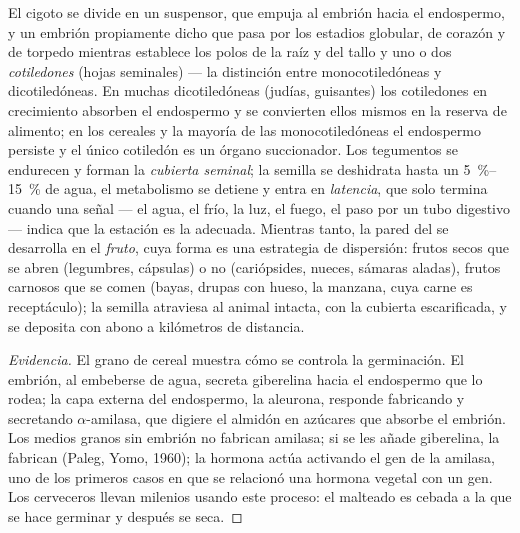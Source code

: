 \begin{definition}\label{def:b2:angiosperm-reproduction:seed}
El cigoto se divide en un suspensor, que empuja al embrión hacia el
endospermo, y un embrión propiamente dicho que pasa por los estadios
globular, de corazón y de torpedo mientras establece los polos de la
raíz y del tallo y uno o dos \emph{cotiledones} (hojas seminales) --- la
distinción entre monocotiledóneas y dicotiledóneas. En muchas
dicotiledóneas (judías, guisantes) los cotiledones en crecimiento
absorben el endospermo y se convierten ellos mismos en la reserva de
alimento; en los cereales y la mayoría de las monocotiledóneas el
endospermo persiste y el único cotiledón es un órgano succionador. Los
tegumentos se endurecen y forman la \emph{cubierta seminal}; la semilla
se deshidrata hasta un \qtyrange{5}{15}{\%} de agua, el metabolismo se
detiene y entra en \emph{latencia}, que solo termina cuando una señal
--- el agua, el frío, la luz, el fuego, el paso por un tubo digestivo ---
indica que la estación es la adecuada. Mientras tanto, la pared del
 se desarrolla en el \emph{fruto}, cuya forma es una estrategia de
dispersión: frutos secos que se abren (legumbres, cápsulas) o no
(cariópsides, nueces, sámaras aladas), frutos carnosos que se comen
(bayas, drupas con hueso, la manzana, cuya carne es receptáculo); la
semilla atraviesa al animal intacta, con la cubierta escarificada, y se
deposita con abono a kilómetros de distancia.
\end{definition}
\begin{proof}[Evidencia]
El grano de cereal muestra cómo se controla la germinación. El embrión,
al embeberse de agua, secreta giberelina hacia el endospermo que lo
rodea; la capa externa del endospermo, la aleurona, responde fabricando
y secretando $\alpha$-amilasa, que digiere el almidón en azúcares que
absorbe el embrión. Los medios granos sin embrión no fabrican amilasa; si
se les añade giberelina, la fabrican (Paleg, Yomo, 1960); la hormona
actúa activando el gen de la amilasa, uno de los primeros casos en que
se relacionó una hormona vegetal con un gen. Los cerveceros llevan
milenios usando este proceso: el malteado es cebada a la que se hace
germinar y después se seca.
\end{proof}


